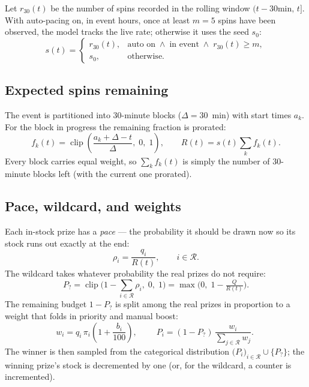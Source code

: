 \documentclass[11pt]{article}
\newcommand{\R}{\mathcal{R}}
\newcommand{\clip}{\operatorname{clip}}
\begin{document}
Let $r_{30}(t)$ be the number of spins recorded in the rolling window
$(t-30\text{min},\,t]$. With auto-pacing on, in event hours, once at least
$m=5$ spins have been observed, the model tracks the live rate; otherwise it
uses the seed $s_0$:
\begin{equation}
s(t) =
\begin{cases}
r_{30}(t), & \text{auto on} \;\wedge\; \text{in event} \;\wedge\; r_{30}(t) \ge m, \\[4pt]
s_0, & \text{otherwise.}
\end{cases}
\end{equation}

\subsection{Expected spins remaining}

The event is partitioned into 30-minute blocks ($\Delta = 30$~min) with start
times $a_k$. For the block in progress the remaining fraction is prorated:
\begin{equation}
f_k(t) = \clip\!\left(\frac{a_k + \Delta - t}{\Delta},\; 0,\; 1\right),
\qquad
R(t) = s(t)\sum_{k} f_k(t).
\end{equation}
Every block carries equal weight, so $\sum_k f_k(t)$ is simply the number of
30-minute blocks left (with the current one prorated).

\subsection{Pace, wildcard, and weights}

Each in-stock prize has a \emph{pace} --- the probability it should be drawn now
so its stock runs out exactly at the end:
\begin{equation}
\rho_i = \frac{q_i}{R(t)}, \qquad i \in \R.
\end{equation}
The wildcard takes whatever probability the real prizes do not require:
\begin{equation}
\boxed{\;
P_? = \clip\!\Big(1 - \textstyle\sum_{i \in \R}\rho_i,\; 0,\; 1\Big)
     = \max\!\Big(0,\; 1 - \tfrac{Q}{R(t)}\Big).
\;}
\end{equation}
The remaining budget $1-P_?$ is split among the real prizes in proportion to a
weight that folds in priority and manual boost:
\begin{equation}
w_i = q_i \,\pi_i \left(1 + \frac{b_i}{100}\right),
\qquad
\boxed{\;
P_i = (1 - P_?)\,\frac{w_i}{\sum_{j \in \R} w_j}.
\;}
\end{equation}
The winner is then sampled from the categorical distribution
$\big(P_i\big)_{i \in \R} \cup \{P_?\}$; the winning prize's stock is decremented
by one (or, for the wildcard, a counter is incremented).
\end{document}
